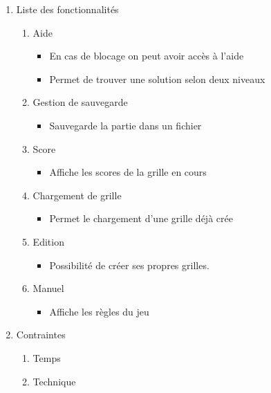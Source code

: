 \documentclass[12pt]{beamer}
\begin{document}
   \begin{frame}
   \begin{enumerate}
   \item Liste des fonctionnalités
    
    \begin{enumerate}
                        
        \item Aide
        \begin{itemize}
            \item En cas de blocage on peut avoir accès à l'aide 
            \item Permet de trouver une solution selon deux niveaux
        \end{itemize}\pause
                        
        \item Gestion de sauvegarde
        \begin{itemize}
            \item Sauvegarde la partie dans un fichier
        \end{itemize}\pause
                        
        \item Score
        \begin{itemize}
            \item Affiche les scores de la grille en cours
        \end{itemize}\pause
                        
        \item Chargement de grille
        \begin{itemize}
            \item Permet le chargement d'une grille déjà crée
        \end{itemize}\pause
                        
        \item Edition
        \begin{itemize}
            \item Possibilité de créer ses propres grilles.
        \end{itemize}\pause
                        
        \item Manuel
        \begin{itemize}
            \item Affiche les règles du jeu
        \end{itemize}\pause
    \end{enumerate}
    
    
    \item Contraintes 
    \begin{enumerate}
        \item Temps
        \item Technique
    \end{enumerate}
    
    
    \end{enumerate}
\end{frame}
\end{document}
